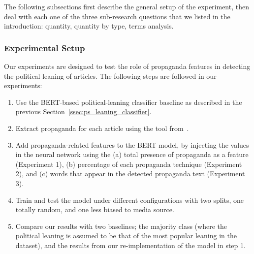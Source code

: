 The following subsections first describe the general setup of the experiment, then deal with each one of the three sub-research questions that we listed in the introduction: quantity, quantity by type, terms analysis.%




\subsubsection{Experimental Setup}

Our experiments are designed to test the role of propaganda features in detecting the political leaning of articles. The following steps are followed in our experiments:
\begin{enumerate}
    \item Use the BERT-based political-leaning classifier baseline as described in the previous Section~\ref{ssec:ps_leaning_classifier}. %
    \item Extract propaganda for each article using the tool from~\citet{da2019fine}.
    \item Add propaganda-related features to the BERT model, by injecting the values in the neural network using the (a) total presence of propaganda as a feature (Experiment 1), (b) percentage of each propaganda technique (Experiment 2), and (c) words that appear in the detected propaganda text (Experiment 3).
    \item Train and test the model under different configurations with two splits, one totally random, and one less biased to media source.
    \item Compare our results with two baselines; the majority class (where the political leaning is assumed to be that of the most popular leaning in the dataset), and the results from our re-implementation of the model in step 1. %
\end{enumerate}


